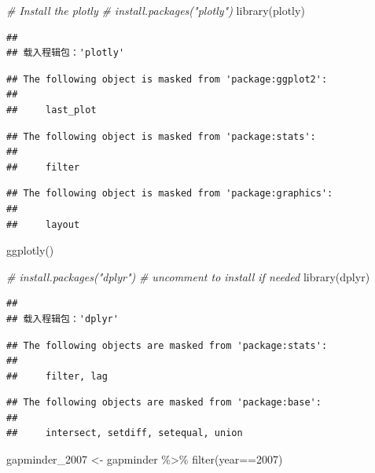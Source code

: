\documentclass[
]{article}
\newenvironment{Shaded}{\begin{snugshade}}{\end{snugshade}}
\newcommand{\CommentTok}[1]{\textcolor[rgb]{0.56,0.35,0.01}{\textit{#1}}}
\newcommand{\DecValTok}[1]{\textcolor[rgb]{0.00,0.00,0.81}{#1}}
\newcommand{\FunctionTok}[1]{\textcolor[rgb]{0.00,0.00,0.00}{#1}}
\newcommand{\NormalTok}[1]{#1}
\newcommand{\OtherTok}[1]{\textcolor[rgb]{0.56,0.35,0.01}{#1}}
\newcommand{\SpecialCharTok}[1]{\textcolor[rgb]{0.00,0.00,0.00}{#1}}
\begin{document}
\begin{Shaded}
\begin{Highlighting}[]
\CommentTok{\# Install the plotly}
\CommentTok{\# install.packages("plotly")}
\FunctionTok{library}\NormalTok{(plotly)}
\end{Highlighting}
\end{Shaded}

\begin{verbatim}
## 
## 载入程辑包：'plotly'
\end{verbatim}

\begin{verbatim}
## The following object is masked from 'package:ggplot2':
## 
##     last_plot
\end{verbatim}

\begin{verbatim}
## The following object is masked from 'package:stats':
## 
##     filter
\end{verbatim}

\begin{verbatim}
## The following object is masked from 'package:graphics':
## 
##     layout
\end{verbatim}

\begin{Shaded}
\begin{Highlighting}[]
\FunctionTok{ggplotly}\NormalTok{()}
\end{Highlighting}
\end{Shaded}

\begin{Shaded}
\begin{Highlighting}[]
\CommentTok{\# install.packages("dplyr")}
\CommentTok{\# uncomment to install if needed}
\FunctionTok{library}\NormalTok{(dplyr)}
\end{Highlighting}
\end{Shaded}

\begin{verbatim}
## 
## 载入程辑包：'dplyr'
\end{verbatim}

\begin{verbatim}
## The following objects are masked from 'package:stats':
## 
##     filter, lag
\end{verbatim}

\begin{verbatim}
## The following objects are masked from 'package:base':
## 
##     intersect, setdiff, setequal, union
\end{verbatim}

\begin{Shaded}
\begin{Highlighting}[]
\NormalTok{gapminder\_2007 }\OtherTok{\textless{}{-}}\NormalTok{ gapminder }\SpecialCharTok{\%\textgreater{}\%} \FunctionTok{filter}\NormalTok{(year}\SpecialCharTok{==}\DecValTok{2007}\NormalTok{)}
\end{Highlighting}
\end{Shaded}
\end{document}
